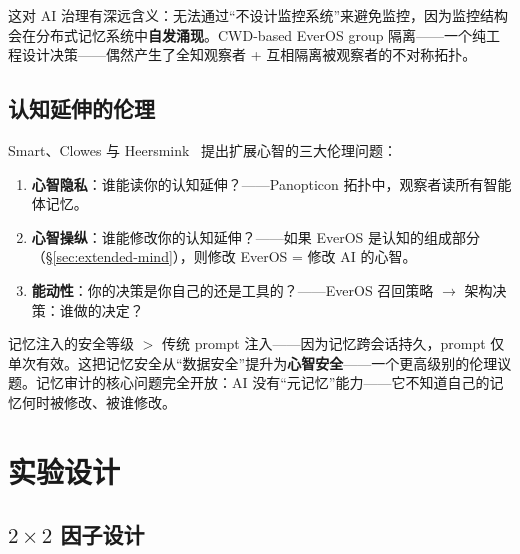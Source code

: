 \documentclass[11pt, a4paper]{article}
\begin{document}
这对 AI 治理有深远含义：无法通过``不设计监控系统''来避免监控，因为监控结构会在分布式记忆系统中\textbf{自发涌现}。CWD-based EverOS group 隔离——一个纯工程设计决策——偶然产生了全知观察者 + 互相隔离被观察者的不对称拓扑。

\subsection{认知延伸的伦理}
\label{sec:ethics-theory}

Smart、Clowes 与 Heersmink~\cite{smart2024ethics} 提出扩展心智的三大伦理问题：

\begin{enumerate}
  \item \textbf{心智隐私}：谁能读你的认知延伸？——Panopticon 拓扑中，观察者读所有智能体记忆。
  \item \textbf{心智操纵}：谁能修改你的认知延伸？——如果 EverOS 是认知的组成部分（§\ref{sec:extended-mind}），则修改 EverOS = 修改 AI 的心智。
  \item \textbf{能动性}：你的决策是你自己的还是工具的？——EverOS 召回策略 $\to$ 架构决策：谁做的决定？
\end{enumerate}

记忆注入的安全等级 $>$ 传统 prompt 注入——因为记忆跨会话持久，prompt 仅单次有效。这把记忆安全从``数据安全''提升为\textbf{心智安全}——一个更高级别的伦理议题。记忆审计的核心问题完全开放：AI 没有``元记忆''能力——它不知道自己的记忆何时被修改、被谁修改。

\section{实验设计}

\subsection{$2 \times 2$ 因子设计}
\end{document}
